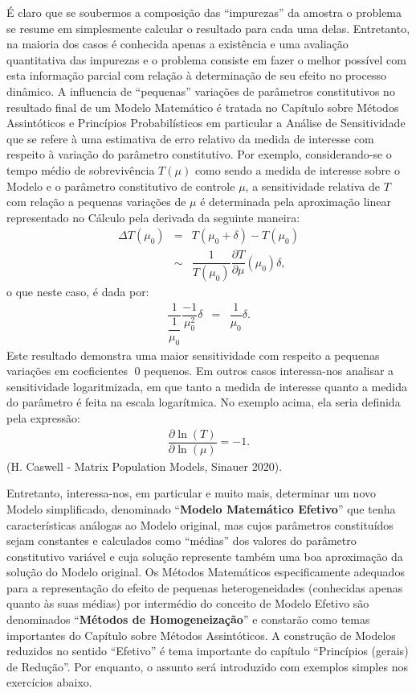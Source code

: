     É claro que se soubermos a composição das ``impurezas'' da amostra o problema se resume em simplesmente calcular o resultado para cada uma delas. Entretanto, na maioria dos casos é conhecida apenas a existência e uma avaliação quantitativa das impurezas e o problema consiste em fazer o melhor possível com esta informação parcial com relação à determinação de seu efeito no processo dinâmico. A influencia de ``pequenas'' variações de parâmetros constitutivos no resultado final de um Modelo Matemático é tratada no Capítulo sobre Métodos Assintóticos e Princípios Probabilísticos em particular a Análise de Sensitividade que se refere à uma estimativa de erro relativo da medida de interesse com respeito à variação do parâmetro constitutivo. Por exemplo, considerando-se o tempo médio de sobrevivência \(T(\mu)\) como sendo a medida de interesse sobre o Modelo e o parâmetro constitutivo de controle \(\mu\), a sensitividade relativa de \(T\) com relação a pequenas variações de \(\mu\) é determinada pela aproximação linear representado no Cálculo pela derivada da seguinte maneira:
    \begin{eqnarray}
    \Delta T(\mu_0) &=& T(\mu_0+\delta)-T(\mu_0) \nonumber \\
    &\sim& \dfrac{1}{T(\mu_0)} \dfrac{\partial T}{\partial \mu}(\mu_0) \delta,
    \end{eqnarray}
    o que neste caso, é dada por:
    \begin{eqnarray}
    \dfrac{1}{\dfrac{1}{\mu_0}} \dfrac{-1}{\mu_0^2} \delta &=& \dfrac{1}{\mu_0} \delta.
    \end{eqnarray}
    Este resultado demonstra uma maior sensitividade com respeito a pequenas variações em coeficientes 0 pequenos. Em outros casos interessa-nos analisar a sensitividade logaritmizada, em que tanto a medida de interesse quanto a medida do parâmetro é feita na escala logarítmica. No exemplo acima, ela seria definida pela expressão:
    \begin{eqnarray}
    \dfrac{\partial \ln(T)}{\partial \ln(\mu)} = -1.
    \end{eqnarray}
    (H. Caswell - Matrix Population Models, Sinauer 2020).

    Entretanto, interessa-nos, em particular e muito mais, determinar um novo Modelo simplificado, denominado ``\textbf{Modelo Matemático Efetivo}'' que tenha características análogas ao Modelo original, mas cujos parâmetros constituídos sejam constantes e calculados como ``médias'' dos valores do parâmetro constitutivo variável e cuja solução represente também uma boa aproximação da solução do Modelo original. Os Métodos Matemáticos especificamente adequados para a representação do efeito de pequenas heterogeneidades (conhecidas apenas quanto às suas médias) por intermédio do conceito de Modelo Efetivo são denominados ``\textbf{Métodos de Homogeneização}'' e constarão como temas importantes do Capítulo sobre Métodos Assintóticos. A construção de Modelos reduzidos no sentido ``Efetivo'' é tema importante do capítulo ``Princípios (gerais) de Redução''. Por enquanto, o assunto será introduzido com exemplos simples nos exercícios abaixo.

